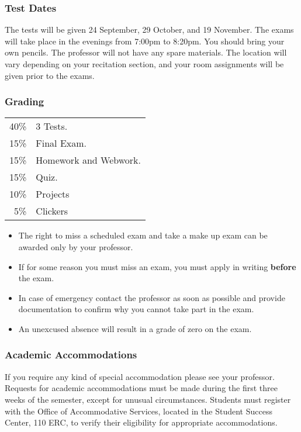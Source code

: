 \begin{frame}
  \frametitle{Test Dates}

  The tests will be given 24 September, 29 October,
  and 19 November. The exams will take place in the evenings from
  7:00pm to 8:20pm. You should bring your own pencils.  The professor
  will not have any spare materials. The location will vary depending
  on your recitation section, and your room assignments will be given
  prior to the exams.
  
\end{frame}


\begin{frame}
  \frametitle{Grading}

   \begin{tabular}[t]{rl}
    40\% & 3 Tests. \\
    15\% & Final Exam. \\
    15\% & Homework and Webwork. \\
    15\% & Quiz. \\
    10\% & Projects\\
     5\% & Clickers
  \end{tabular}

  \begin{itemize}
  \item The right to miss a scheduled exam and take a make up exam can
    be awarded only by your professor.
  \item If for some reason you must miss an exam, you must apply in
    writing {\bf before} the exam.
  \item In case of emergency contact the professor as soon as possible
    and provide documentation to confirm why you cannot take part in
    the exam. 
  \item An unexcused absence will result in a grade of zero on the
    exam.
  \end{itemize}


  
\end{frame}


\begin{frame}
  \frametitle{Academic Accommodations}

  If you require any kind of special
  accommodation please see your professor.  Requests for academic
  accommodations must be made during the first three weeks of the
  semester, except for unusual circumstances.  Students must register
  with the Office of Accommodative Services, located in the Student
  Success Center, 110 ERC, to verify their eligibility for appropriate
  accommodations.
  
\end{frame}

